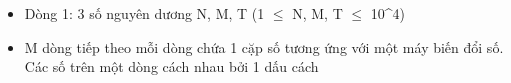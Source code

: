 \begin{itemize}
	\item Dòng 1: 3 số nguyên dương N, M, T (1  $\le$  N, M, T  $\le$  10^4)
	\item M dòng tiếp theo mỗi dòng chứa 1 cặp số tương ứng với một máy biến đổi số. Các số trên một dòng cách nhau bởi 1 dấu cách
\end{itemize}
